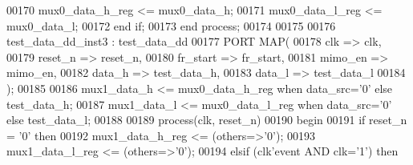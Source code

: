 \begin{DoxyCode}
00170         \textcolor{vhdlchar}{mux0_data_h_reg} \textcolor{vhdlchar}{<=} \textcolor{vhdlchar}{mux0_data_h};
00171         \textcolor{vhdlchar}{mux0_data_l_reg} \textcolor{vhdlchar}{<=} \textcolor{vhdlchar}{mux0_data_l};
00172     \textcolor{keywordflow}{end} \textcolor{keywordflow}{if};
00173 \textcolor{keywordflow}{end} \textcolor{keywordflow}{process};
00174 
00175 
00176 test_data_dd_inst3 : test_data_dd
00177   \textcolor{keywordflow}{PORT} \textcolor{keywordflow}{MAP}(
00178             clk             => clk,
00179             reset_n         => reset_n,
00180             fr_start            => fr_start,
00181             mimo_en         => mimo_en,
00182             data_h          => test_data_h,
00183             data_l          => test_data_l
00184         \textcolor{vhdlchar}{)};
00185           
00186 \textcolor{vhdlchar}{mux1_data_h} \textcolor{vhdlchar}{<=} \textcolor{vhdlchar}{mux0_data_h_reg} \textcolor{keywordflow}{when} \textcolor{vhdlchar}{data_src}\textcolor{vhdlchar}{=}\textcolor{vhdlchar}{'}\textcolor{vhdllogic}{}\textcolor{vhdllogic}{0}\textcolor{vhdlchar}{'} \textcolor{keywordflow}{else} \textcolor{vhdlchar}{test_data_h};
00187 \textcolor{vhdlchar}{mux1_data_l} \textcolor{vhdlchar}{<=} \textcolor{vhdlchar}{mux0_data_l_reg} \textcolor{keywordflow}{when} \textcolor{vhdlchar}{data_src}\textcolor{vhdlchar}{=}\textcolor{vhdlchar}{'}\textcolor{vhdllogic}{}\textcolor{vhdllogic}{0}\textcolor{vhdlchar}{'} \textcolor{keywordflow}{else} \textcolor{vhdlchar}{test_data_l};
00188 
00189 \textcolor{keywordflow}{process}(clk, reset_n)
00190 \textcolor{vhdlkeyword}{begin }
00191     \textcolor{keywordflow}{if} \textcolor{vhdlchar}{reset_n} \textcolor{vhdlchar}{=} \textcolor{vhdlchar}{'}\textcolor{vhdllogic}{}\textcolor{vhdllogic}{0}\textcolor{vhdlchar}{'} \textcolor{keywordflow}{then} 
00192         \textcolor{vhdlchar}{mux1_data_h_reg} \textcolor{vhdlchar}{<=} \textcolor{vhdlchar}{(}\textcolor{keywordflow}{others}\textcolor{vhdlchar}{=}\textcolor{vhdlchar}{>}\textcolor{vhdlchar}{'}\textcolor{vhdllogic}{}\textcolor{vhdllogic}{0}\textcolor{vhdlchar}{'}\textcolor{vhdlchar}{)};
00193         \textcolor{vhdlchar}{mux1_data_l_reg} \textcolor{vhdlchar}{<=} \textcolor{vhdlchar}{(}\textcolor{keywordflow}{others}\textcolor{vhdlchar}{=}\textcolor{vhdlchar}{>}\textcolor{vhdlchar}{'}\textcolor{vhdllogic}{}\textcolor{vhdllogic}{0}\textcolor{vhdlchar}{'}\textcolor{vhdlchar}{)};
00194     \textcolor{keywordflow}{elsif} \textcolor{vhdlchar}{(}\textcolor{vhdlchar}{clk}\textcolor{vhdlchar}{'}\textcolor{vhdlkeyword}{event} \textcolor{keywordflow}{AND} \textcolor{vhdlchar}{clk}\textcolor{vhdlchar}{=}\textcolor{vhdlchar}{'}\textcolor{vhdllogic}{}\textcolor{vhdllogic}{1}\textcolor{vhdlchar}{'}\textcolor{vhdlchar}{)} \textcolor{keywordflow}{then} 

\end{DoxyCode}
